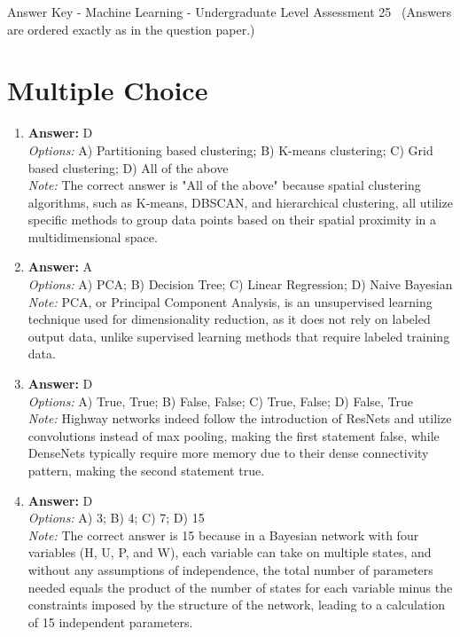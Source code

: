 \documentclass[12pt]{article}
\begin{document}
\begin{center}
Answer Key - Machine Learning - Undergraduate Level Assessment 25 \
\small (Answers are ordered exactly as in the question paper.)
\end{center}

\section*{Multiple Choice}
\begin{enumerate}[label=\arabic*.]
\item \textbf{Answer:} D
\\ \textit{Options:} A) Partitioning based clustering; B) K-means clustering; C) Grid based clustering; D) All of the above
\\ \textit{Note:} The correct answer is "All of the above" because spatial clustering algorithms, such as K-means, DBSCAN, and hierarchical clustering, all utilize specific methods to group data points based on their spatial proximity in a multidimensional space.
\item \textbf{Answer:} A
\\ \textit{Options:} A) PCA; B) Decision Tree; C) Linear Regression; D) Naive Bayesian
\\ \textit{Note:} PCA, or Principal Component Analysis, is an unsupervised learning technique used for dimensionality reduction, as it does not rely on labeled output data, unlike supervised learning methods that require labeled training data.
\item \textbf{Answer:} D
\\ \textit{Options:} A) True, True; B) False, False; C) True, False; D) False, True
\\ \textit{Note:} Highway networks indeed follow the introduction of ResNets and utilize convolutions instead of max pooling, making the first statement false, while DenseNets typically require more memory due to their dense connectivity pattern, making the second statement true.
\item \textbf{Answer:} D
\\ \textit{Options:} A) 3; B) 4; C) 7; D) 15
\\ \textit{Note:} The correct answer is 15 because in a Bayesian network with four variables (H, U, P, and W), each variable can take on multiple states, and without any assumptions of independence, the total number of parameters needed equals the product of the number of states for each variable minus the constraints imposed by the structure of the network, leading to a calculation of 15 independent parameters.

\end{enumerate}
\end{document}
